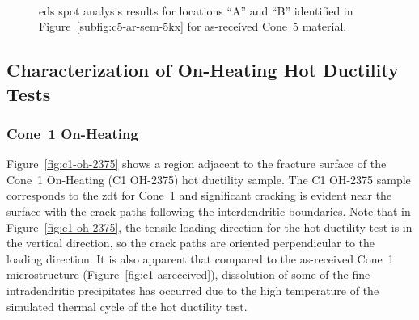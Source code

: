 {\begin{figure}
    \centering
     \\
    \caption[]{\Gls{eds} spot analysis results for locations ``A'' and ``B'' identified in Figure~\ref{subfig:c5-ar-sem-5kx} for as-received Cone~5 material.}
    \label{fig:c5-ar-eds}
\end{figure}


\subsection{Characterization of On-Heating Hot Ductility Tests}
\subsubsection{Cone~1 On-Heating}
Figure~\ref{fig:c1-oh-2375} shows a region adjacent to the fracture surface of the Cone~1 On-Heating  (C1 OH-2375) hot ductility sample. The C1 OH-2375 sample corresponds to the \gls{zdt} for Cone~1 and significant cracking is evident near the surface with the crack paths following the interdendritic boundaries. Note that in Figure~\ref{fig:c1-oh-2375}, the tensile loading direction for the hot ductility test is in the vertical direction, so the crack paths are oriented perpendicular to the loading direction. It is also apparent that compared to the as-received Cone~1 microstructure (Figure~\ref{fig:c1-asreceived}), dissolution of some of the fine intradendritic precipitates has occurred due to the high temperature of the simulated thermal cycle of the hot ductility test.

}
